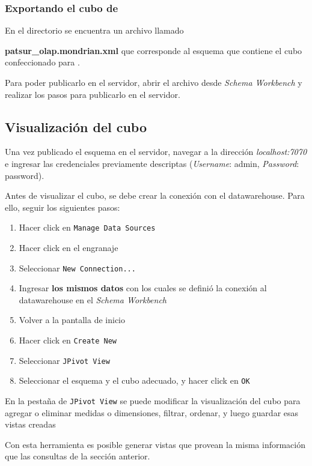 \subsubsection{Exportando el cubo de }

En el directorio  se encuentra un archivo llamado 

\textbf{patsur\_olap.mondrian.xml} que corresponde al esquema que contiene el cubo confeccionado para .

Para poder publicarlo en el servidor, abrir el archivo desde \emph{Schema Workbench} y realizar los pasos para publicarlo en el servidor. 


\subsection{Visualización del cubo}

Una vez publicado el esquema en el servidor, navegar a la dirección \emph{localhost:7070} e ingresar las credenciales previamente descriptas (\emph{Username}: admin, \emph{Password}: password). 

Antes de visualizar el cubo, se debe crear la conexión con el datawarehouse. Para ello, seguir los siguientes pasos:

\begin{enumerate}
    \item Hacer click en \texttt{Manage Data Sources}
    \item Hacer click en el engranaje
    \item Seleccionar \texttt{New Connection...}
    \item Ingresar \textbf{los mismos datos} con los cuales se definió la conexión al datawarehouse en el \emph{Schema Workbench}   
    \item Volver a la pantalla de inicio
    \item Hacer click en \texttt{Create New}
    \item Seleccionar \texttt{JPivot View} 
    \item Seleccionar el esquema y el cubo adecuado, y hacer click en \texttt{OK} 
\end{enumerate}

En la pestaña de \texttt{JPivot View} se puede modificar la visualización del cubo para agregar o eliminar medidas o dimensiones, filtrar, ordenar, y luego guardar esas vistas creadas 

Con esta herramienta es posible generar vistas que provean la misma información que las consultas de la sección anterior.






\clearpage
\printbibliography



